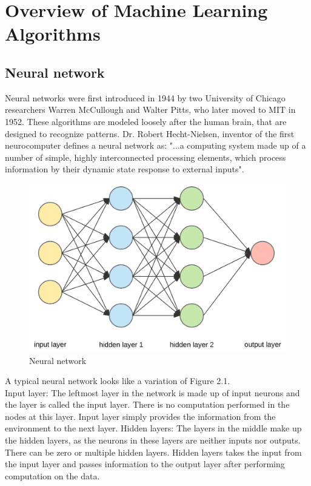 \section{Overview of Machine Learning Algorithms}
\subsection{Neural network}
Neural networks were first introduced in 1944 by two University of Chicago researchers Warren McCullough and Walter Pitts, who later moved to MIT in 1952. These algorithms are modeled loosely after the human brain, that are designed to recognize patterns.  Dr. Robert Hecht-Nielsen, inventor of the first neurocomputer defines a neural network as:
"...a computing system made up of a number of simple, highly interconnected processing elements, which process information by their dynamic state response to external inputs"\cite{Caudill}.
\begin{figure}[htb!]
    \centering
    \includegraphics[scale=0.15]{files/nn.png}
    \caption{Neural network}
    \label{Neural network}
    \end{figure}
    \FloatBarrier
A typical neural network looks like a variation of Figure 2.1. \\
Input layer: The leftmost layer in the network is made up of input neurons and the layer is called the input layer. There is no computation performed in the nodes at this layer. Input layer simply provides the information from the environment to the next layer.
Hidden layers: The layers in the middle make up the hidden layers, as the neurons in these layers are neither inputs nor outputs. There can be zero or multiple hidden layers. Hidden layers takes the input from the input layer and passes information to the output layer after performing computation on the data. 
